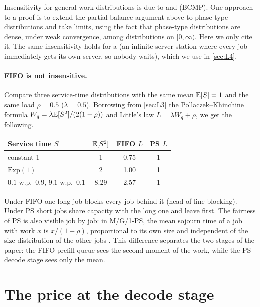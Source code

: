 \begin{remark}
Insensitivity for general work distributions is due to \cite{kelly1979} and
\cite{bcmp1975} (BCMP). One approach to a proof is to extend the partial balance argument
above to phase-type distributions and take limits, using the fact that phase-type
distributions are dense, under weak convergence, among distributions on $[0,\infty)$.
Here we only cite it.
The same insensitivity holds for a  (an infinite-server station
where every job immediately gets its own server, so nobody waits), which we use in
\cref{sec:L4}.
\end{remark}

\paragraph{FIFO is not insensitive.} Compare three service-time distributions with the
same mean $\mathbb{E}[S]=1$ and the same load $\rho=0.5$ ($\lambda=0.5$). Borrowing from
\cref{sec:L3} the Pollaczek--Khinchine formula $W_q=\lambda\mathbb{E}[S^2]/(2(1-\rho))$ and
Little's law $L=\lambda W_q+\rho$, we get the following.
\begin{center}\small
\begin{tabular}{@{}lccc@{}}
\toprule
Service time $S$ & $\mathbb{E}[S^2]$ & FIFO $L$ & PS $L$ \\
\midrule
constant 1 & 1 & 0.75 & 1 \\
$\mathrm{Exp}(1)$ & 2 & 1.00 & 1 \\
$0.1$ w.p.\ $0.9$, $9.1$ w.p.\ $0.1$ & 8.29 & 2.57 & 1 \\
\bottomrule
\end{tabular}
\end{center}
Under FIFO one long job blocks every job behind it (head-of-line blocking). Under PS
short jobs share capacity with the long one and leave first.
The fairness of PS is also visible job by job: in M/G/1-PS, the mean sojourn time of
a job with work $x$ is $x/(1-\rho)$, proportional to its own size and independent of
the size distribution of the other jobs \cite{kleinrock1976}.
This difference separates the two stages of the paper: the FIFO prefill queue sees the
second moment of the work, while the PS decode stage sees only the mean.

\section{The price at the decode stage}


